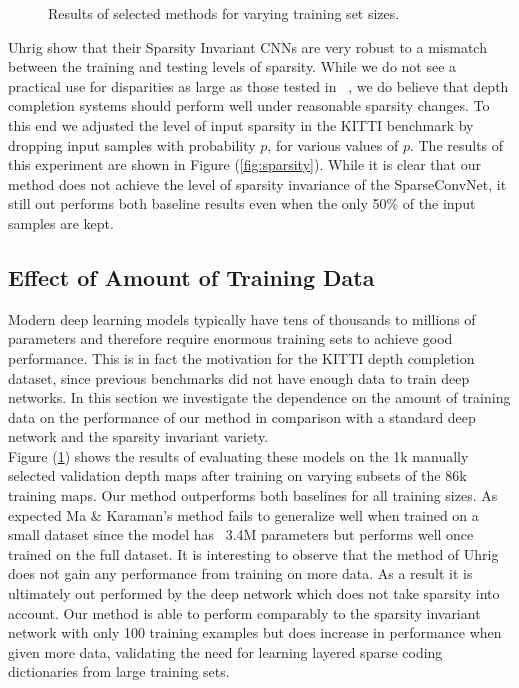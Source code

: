 \begin{figure}
\begin{minipage}{0.45\textwidth}
    \caption{Results of selected methods for varying training set sizes.}
    \label{fig:trainsize}
  \end{minipage}
\end{figure}

Uhrig \etal show that their Sparsity Invariant CNNs are very robust to a mismatch between the training and testing levels of sparsity. While we do not see a practical use for disparities as large as those tested in ~\cite{uhrig}, we do believe that depth completion systems should perform well under reasonable sparsity changes. To this end we adjusted the level of input sparsity in the KITTI benchmark by dropping input samples with probability $p$, for various values of $p$. The results of this experiment are shown in Figure (\ref{fig:sparsity}). While it is clear that our method does not achieve the level of sparsity invariance of the SparseConvNet, it still out performs both baseline results even when the only 50\% of the input samples are kept.
\subsection{Effect of Amount of Training Data}
\label{sec:effect-training-data}

Modern deep learning models typically have tens of thousands to millions of parameters and therefore require enormous training sets to achieve good performance. This is in fact the motivation for the KITTI depth completion dataset, since previous benchmarks did not have enough data to train deep networks. In this section we investigate the dependence on the amount of training data on the performance of our method in comparison with a standard deep network and the sparsity invariant variety.\\
Figure (\ref{fig:trainsize}) shows the results of evaluating these models on the 1k manually selected validation depth maps after training on varying subsets of the 86k training maps. Our method outperforms both baselines for all training sizes. As expected Ma \& Karaman's method fails to generalize well when trained on a small dataset since the model has ~3.4M parameters but performs well once trained on the full dataset. It is interesting to observe that the method of Uhrig \etal does not gain any performance from training on more data. As a result it is ultimately out performed by the deep network which does not take sparsity into account. Our method is able to perform comparably to the sparsity invariant network with only 100 training examples but does increase in performance when given more data, validating the need for learning layered sparse coding dictionaries from large training sets. 
